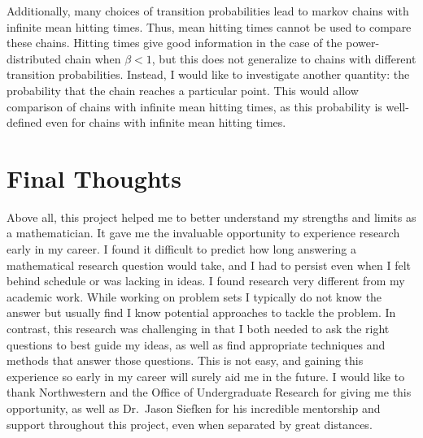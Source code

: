 \documentclass[12pt,letterpaper]{article}
\begin{document}
Additionally, many choices of transition probabilities lead to markov chains with infinite mean hitting
times. Thus, mean hitting times cannot be used to compare these chains. Hitting times give good
information in the case of the power-distributed chain when $\beta < 1$, but this does not generalize to
chains with different transition probabilities. Instead, I would like to investigate another quantity:
the probability that the chain reaches a particular point. This would allow comparison of chains with
infinite mean hitting times, as this probability is well-defined even for chains with infinite mean
hitting times.


\section*{Final Thoughts}
Above all, this project helped me to better understand my strengths and limits as a mathematician. It
gave me the invaluable opportunity to experience research early in my career. I found it difficult to
predict how long answering a mathematical research question would take, and I had to persist even when I
felt behind schedule or was lacking in ideas. I found research very different from my academic work.
While working on problem sets I typically do not know the answer but usually find I know potential
approaches to tackle the problem. In contrast, this research was challenging in that I both needed to
ask the right questions to best guide my ideas, as well as find appropriate techniques and methods that
answer those questions. This is not easy, and gaining this experience so early in my career
will surely aid me in the future. I would like to thank Northwestern and the Office of Undergraduate
Research for giving me this opportunity, as well as Dr.~Jason Siefken for his incredible mentorship and
support throughout this project, even when separated by great distances.
\end{document}
